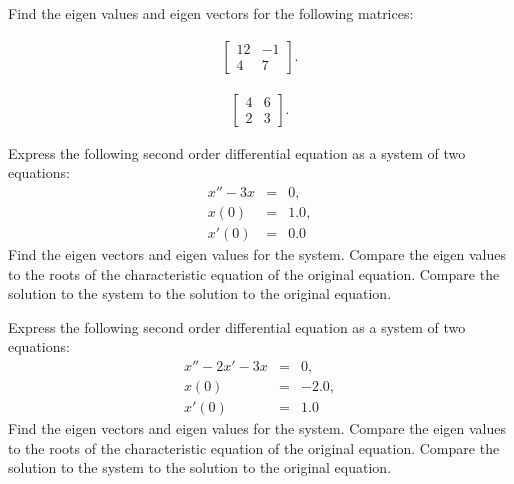 

\begin{problem}
\item  Find the eigen values and eigen vectors for the following matrices:

  \begin{subproblem}
  \item
    \begin{eqnarray}
      \left[
        \begin{array}{rr}
          12 & -1 \\
          4 & 7
        \end{array}
      \right].
    \end{eqnarray}
    \vfill

  \item 
    \begin{eqnarray}
      \left[
        \begin{array}{rr}
          4 & 6 \\
          2 & 3
        \end{array}
      \right].
    \end{eqnarray}
    \vfill
      
  \end{subproblem}
\end{problem}

\begin{problem}
\item Express the following second order differential equation as a
  system of two equations:
  \begin{eqnarray}
    x'' - 3x & = & 0, \\
    x(0) & = & 1.0, \\
    x'(0) & = & 0.0
  \end{eqnarray}
  Find the eigen vectors and eigen values for the system. Compare the
  eigen values to the roots of the characteristic equation of the
  original equation. Compare the solution to the system to the
  solution to the original equation.

  \vfill



  \clearpage

\item Express the following second order differential equation as a
  system of two equations:
  \begin{eqnarray}
    x'' - 2x' - 3x & = & 0, \\
    x(0) & = & -2.0, \\
    x'(0) & = & 1.0
  \end{eqnarray}
    Find the eigen vectors and eigen values for the system. Compare
    the eigen values to the roots of the characteristic equation of
    the original equation. Compare the solution to the system to the
    solution to the original equation.

    \vfill


  \end{problem}



